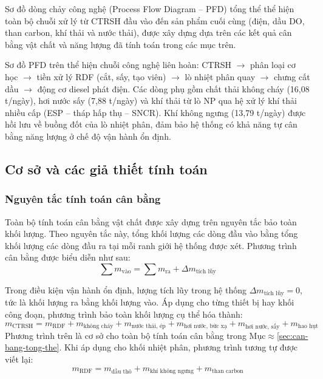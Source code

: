 \documentclass[../main.tex]{subfiles}
\begin{document}
Sơ đồ dòng chảy công nghệ (Process Flow Diagram -- PFD) tổng thể thể hiện toàn bộ chuỗi xử lý từ CTRSH đầu vào đến sản phẩm cuối cùng (điện, dầu DO, than carbon, khí thải và nước thải), được xây dựng dựa trên các kết quả cân bằng vật chất và năng lượng đã tính toán trong các mục trên.

Sơ đồ PFD trên thể hiện chuỗi công nghệ liên hoàn: CTRSH $\to$ phân loại cơ học $\to$ tiền xử lý RDF (cắt, sấy, tạo viên) $\to$ lò nhiệt phân quay $\to$ chưng cất dầu $\to$ động cơ diesel phát điện. Các dòng phụ gồm chất thải không cháy (16,08 t/ngày), hơi nước sấy (7,88 t/ngày) và khí thải từ lò NP qua hệ xử lý khí thải nhiều cấp (ESP -- tháp hấp thụ -- SNCR). Khí không ngưng (13,79 t/ngày) được hồi lưu về buồng đốt của lò nhiệt phân, đảm bảo hệ thống có khả năng tự cân bằng năng lượng ở chế độ vận hành ổn định.


\subsection{Cơ sở và các giả thiết tính toán}

\subsubsection{Nguyên tắc tính toán cân bằng}

Toàn bộ tính toán cân bằng vật chất được xây dựng trên nguyên tắc bảo toàn khối lượng. Theo nguyên tắc này, tổng khối lượng các dòng đầu vào bằng tổng khối lượng các dòng đầu ra tại mỗi ranh giới hệ thống được xét. Phương trình cân bằng được biểu diễn như sau:
\begin{equation}
  \sum m_{\text{vào}} = \sum m_{\text{ra}} + \Delta m_{\text{tích lũy}}
\end{equation}

Trong điều kiện vận hành ổn định, lượng tích lũy trong hệ thống $\Delta m_{\text{tích lũy}} = 0$, tức là khối lượng ra bằng khối lượng vào. Áp dụng cho từng thiết bị hay khối công đoạn, phương trình bảo toàn khối lượng cụ thể hóa thành:
\begin{equation}
  m_{\text{CTRSH}} = m_{\text{RDF}} + m_{\text{không cháy}} + m_{\text{nước thải, ép}} + m_{\text{hơi nước, bức xạ}} + m_{\text{hơi nước, sấy}} + m_{\text{hao hụt}} \tag{3.2}
\end{equation}
Phương trình trên là cơ sở cho toàn bộ tính toán cân bằng trong Mục$\approx$\ref{sec:can-bang-tong-the}. Khi áp dụng cho khối nhiệt phân, phương trình tương tự được viết lại:
\begin{equation}
  m_{\text{RDF}} = m_{\text{dầu thô}} + m_{\text{khí không ngưng}} + m_{\text{than carbon}}
\end{equation}
\end{document}
